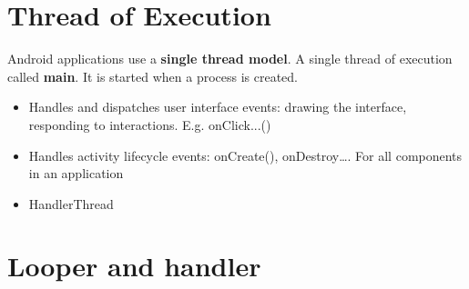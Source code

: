 \documentclass{article}
\begin{document}
\tableofcontents

\newpage

\section{Thread	of	Execution}

\begin{flushleft}
Android applications use a \textbf{single thread model}. A single thread of execution called \textbf{main}. It is started when a process is created.
\begin{itemize}
  \item Handles and dispatches user interface events: drawing the interface, responding to interactions. E.g. onClick...()
  \item Handles activity lifecycle events: onCreate(), onDestroy…. For all components in an application
  \item HandlerThread
\end{itemize}
\end{flushleft}

\section{Looper and handler}
\end{document}
